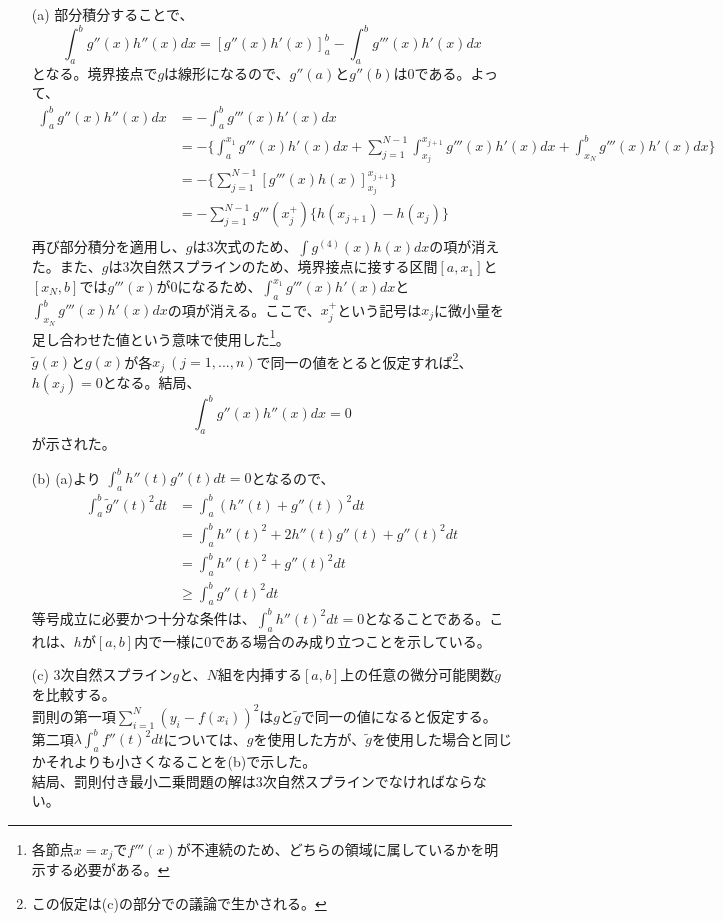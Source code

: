 \documentclass{jsarticle}
\begin{document}
\begin{enumerate}
\item[(a)]部分積分することで、
\[\int_{a}^{b}g''(x)h''(x)dx=[g''(x)h'(x)]_a^b-\int_{a}^{b}g'''(x)h'(x)dx\]
となる。境界接点で$g$は線形になるので、$g''(a)$と$g''(b)$は$0$である。よって、
\begin{align*}
\int_{a}^{b}g''(x)h''(x)dx&=-\int_{a}^{b}g'''(x)h'(x)dx\\
&=-\{\int_{a}^{x_1}g'''(x)h'(x)dx+\sum_{j=1}^{N-1}\int_{x_j}^{x_{j+1}}g'''(x)h'(x)dx+\int_{x_N}^{b}g'''(x)h'(x)dx\}\\
&=-\{\sum_{j=1}^{N-1}[g'''(x)h(x)]_{x_j}^{x_{j+1}}\}\\
&=-\sum_{j=1}^{N-1}g'''(x_j^{+})\{h(x_{j+1})-h(x_j)\}\\
\end{align*}
再び部分積分を適用し、$g$は3次式のため、$\int g^{(4)}(x)h(x)dx$の項が消えた。また、$g$は3次自然スプラインのため、境界接点に接する区間$[a,x_1]$と$[x_N,b]$では$g'''(x)$が$0$になるため、$\int_{a}^{x_1}g'''(x)h'(x)dx$と$\int_{x_N}^{b}g'''(x)h'(x)dx$の項が消える。ここで、$x_j^{+}$という記号は$x_j$に微小量を足し合わせた値という意味で使用した\footnote{各節点$x=x_j$で$f'''(x)$が不連続のため、どちらの領域に属しているかを明示する必要がある。}。\\
$\tilde{g}(x)$と$g(x)$が各$x_j\ (j=1,...,n)$で同一の値をとると仮定すれば\footnote{この仮定は(c)の部分での議論で生かされる。}、$h(x_j)=0$となる。結局、
\[\int_{a}^{b}g''(x)h''(x)dx=0\]
が示された。

\item[(b)]
(a)より $\int_a^b h''(t)g''(t)dt=0$となるので、
\begin{align*}
\int_a^b \tilde{g}''(t)^2dt&=\int_a^b (h''(t)+g''(t))^2dt\\
&=\int_a^b h''(t)^2+2h''(t)g''(t)+g''(t)^2dt\\
&=\int_a^b h''(t)^2+g''(t)^2dt\\
&\geq \int_a^b g''(t)^2dt
\end{align*}
等号成立に必要かつ十分な条件は、$\int_a^b h''(t)^2dt=0$となることである。これは、$h$が$[a,b]$内で一様に$0$である場合のみ成り立つことを示している。

\item[(c)]
3次自然スプライン$g$と、$N$組を内挿する$[a,b]$上の任意の微分可能関数$\tilde{g}$を比較する。\\
罰則の第一項$\sum_{i=1}^N (y_i-f(x_i))^2$は$g$と$\tilde{g}$で同一の値になると仮定する。\\
第二項$\lambda\int_a^b f''(t)^2dt$については、$g$を使用した方が、$\tilde{g}$を使用した場合と同じかそれよりも小さくなることを(b)で示した。\\
結局、罰則付き最小二乗問題の解は3次自然スプラインでなければならない。
\end{enumerate}
\end{document}
